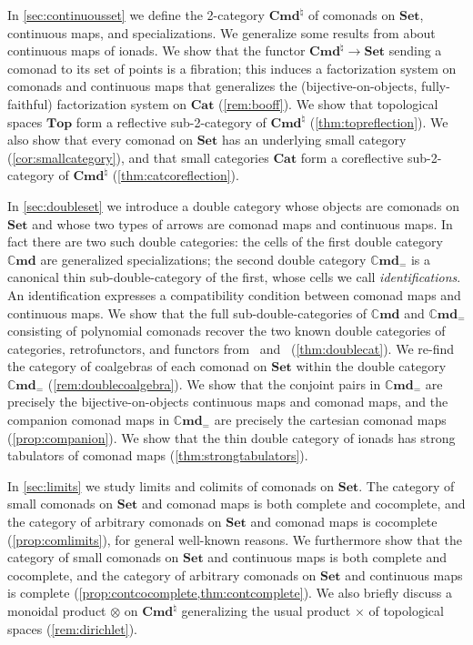 \documentclass[11pt, oneside, article]{memoir}
\theoremstyle{plain}
\theoremstyle{definition}
\theoremstyle{remark}
\newcommand{\namedcat}[1]{\mathbf{#1}}
\newcommand{\Set}{\namedcat{Set}}
\newcommand{\Cat}{\namedcat{Cat}}
\renewcommand{\Top}{\namedcat{Top}}
\newcommand{\Cmd}{\mathbb{C}\namedcat{md}}
\newcommand{\CmdSet}{\Cmd}
\newcommand{\CmdId}{\Cmd_=}
\newcommand{\CmdIdSet}{\CmdId}
\newcommand{\Con}{\namedcat{Cmd}^\natural}
\newcommand{\ConSet}{\Con}
\newcommand{\ConO}{\Con}
\newcommand{\ConOSet}{\ConO}
\begin{document}
In \cref{sec:continuousset} we define the 2-category $\ConSet$ of
comonads on $\Set$, continuous maps, and specializations. We
generalize some results from \cite{garner:ionads} about continuous
maps of ionads. We show that the functor $\ConOSet \to \Set$ sending a
comonad to its set of points is a fibration; this induces a
factorization system on comonads and continuous maps that generalizes
the (bijective-on-objects, fully-faithful) factorization system on
$\Cat$ (\cref{rem:booff}). We show that topological spaces $\Top$ form
a reflective sub-2-category of $\ConO$ (\cref{thm:topreflection}). We
also show that every comonad on $\Set$ has an underlying small
category (\cref{cor:smallcategory}), and that small categories $\Cat$
form a coreflective sub-2-category of $\ConSet$
(\cref{thm:catcoreflection}).

In \cref{sec:doubleset} we introduce a double category whose objects
are comonads on $\Set$ and whose two types of arrows are comonad maps
and continuous maps. In fact there are two such double categories: the
cells of the first double category $\CmdSet$ are generalized
specializations; the second double category $\CmdIdSet$ is a canonical
thin sub-double-category of the first, whose cells we call
\emph{identifications}. An identification expresses a compatibility
condition between comonad maps and continuous maps. We show that the
full sub-double-categories of $\CmdSet$ and $\CmdIdSet$ consisting of
polynomial comonads recover the two known double categories of
categories, retrofunctors, and functors from~\cite{clarke}
and~\cite{clarke-dimeglio} (\cref{thm:doublecat}). We re-find the
category of coalgebras of each comonad on $\Set$ within the double
category $\CmdIdSet$ (\cref{rem:doublecoalgebra}). We show that the
conjoint pairs in $\CmdIdSet$ are precisely the bijective-on-objects
continuous maps and comonad maps, and the companion comonad maps in
$\CmdIdSet$ are precisely the cartesian comonad maps
(\cref{prop:companion}).
We show that the thin double category of ionads has strong tabulators
of comonad maps (\cref{thm:strongtabulators}).

In \cref{sec:limits} we study limits and colimits of comonads on
$\Set$. The category of small comonads on $\Set$ and comonad maps is
both complete and cocomplete, and the category of arbitrary comonads
on $\Set$ and comonad maps is cocomplete (\cref{prop:comlimits}), for
general well-known reasons. We furthermore show that the category of
small comonads on $\Set$ and continuous maps is both complete and
cocomplete, and the category of arbitrary comonads on $\Set$ and
continuous maps is complete
(\cref{prop:contcocomplete,thm:contcomplete}). We also briefly discuss
a monoidal product $\otimes$ on $\ConO$ generalizing the usual product
$\times$ of topological spaces (\cref{rem:dirichlet}).
\end{document}
